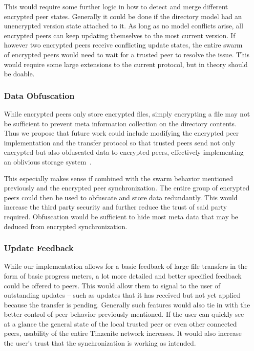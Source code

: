 This would require some further logic in how to detect and merge different encrypted peer states.
Generally it could be done if the directory model had an unencrypted version state attached to it.
As long as no model conflicts arise, all encrypted peers can keep updating themselves to the most current version.
If however two encrypted peers receive conflicting update states, the entire swarm of encrypted peers would need to wait for a trusted peer to resolve the issue.
This would require some large extensions to the current protocol, but in theory should be doable.

\subsubsection{Data Obfuscation}
\label{subs:Data Obfuscation}

While encrypted peers only store encrypted files, simply encrypting a file may not be sufficient to prevent meta information collection on the directory contents.
Thus we propose that future work could include modifying the encrypted peer implementation and the transfer protocol so that trusted peers send not only encrypted but also obfuscated data to encrypted peers, effectively implementing an oblivious storage system~\cite{goldreich1996software}.

This especially makes sense if combined with the swarm behavior mentioned previously and the encrypted peer synchronization.
The entire group of encrypted peers could then be used to obfuscate and store data redundantly.
This would increase the third party security and further reduce the trust of said party required.
Obfuscation would be sufficient to hide most meta data that may be deduced from encrypted synchronization.

\subsubsection{Update Feedback}
\label{subs:Update Feedback}

While our implementation allows for a basic feedback of large file transfers in the form of basic progress meters, a lot more detailed and better specified feedback could be offered to peers.
This would allow them to signal to the user of outstanding updates -- such as updates that it has received but not yet applied because the transfer is pending.
Generally such features would also tie in with the better control of peer behavior previously mentioned.
If the user can quickly see at a glance the general state of the local trusted peer or even other connected peers, usability of the entire Tinzenite network increases.
It would also increase the user's trust that the synchronization is working as intended.

